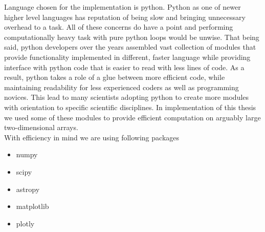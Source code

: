 \documentclass[12pt, a4paper, oneside]{book}
\begin{document}
Language chosen for the implementation is python.
Python as one of newer higher level languages has reputation of being slow and bringing unnecessary overhead to a task.
All of these concerns do have a point and performing computationally heavy task with pure python loops would be unwise.
That being said, python developers over the years assembled vast collection of modules that provide functionality implemented in different, faster language while providing interface with python code that is easier to read with less lines of code.
As a result, python takes a role of a glue between more efficient code, while maintaining readability for less experienced coders as well as programming novices.
This lead to many scientists adopting python to create more modules with orientation to specific scientific disciplines.
In implementation of this thesis we used some of these modules to provide efficient computation on arguably large two-dimensional arrays.\\
With efficiency in mind we are using following packages
\begin{itemize}
    \item numpy
    \item scipy
    \item astropy
    \item matplotlib
    \item plotly
\end{itemize}


\end{document}
